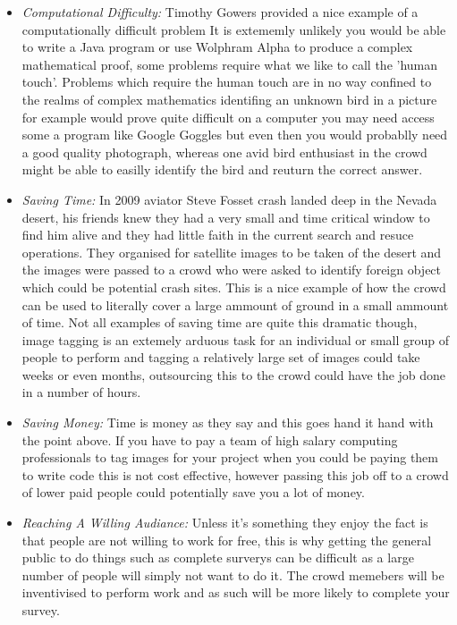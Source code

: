 \documentclass[11pt]{article}
\begin{document}
\begin{itemize}
\item
\emph{Computational Difficulty:} Timothy Gowers provided a nice example of a computationally difficult problem It is extememly unlikely you
would be able to write a Java program or use Wolphram Alpha to produce a complex mathematical proof, some problems require what we like to call
the 'human touch'. Problems which require the human touch are in no way confined to the realms of complex mathematics identifing an unknown
bird in a picture for example would prove quite difficult on a computer you may need access some a program like Google Goggles but even then you 
would probablly need a good quality photograph, whereas one avid bird enthusiast in the crowd might be able to easilly identify the bird and
reuturn the correct answer.
\item
\emph{Saving Time:} In 2009 aviator Steve Fosset crash landed deep in the Nevada desert, his friends knew they had a very small
and time critical window to find him alive and they had little faith in the current search and resuce operations. They organised for satellite 
images to be taken of the desert and the images were passed to a crowd who were asked to identify foreign object which could be potential crash 
sites. This is a nice example of how the crowd can be used to literally cover a large ammount of ground in a small ammount of time. Not all 
examples of saving time are quite this dramatic though, image tagging is an extemely arduous task for an individual or small group of people 
to perform and tagging a relatively large set of images could take weeks or even months, outsourcing this to the crowd could have the job 
done in a number of hours.
\item
\emph{Saving Money:} Time is money as they say and this goes hand it hand with the point above. If you have to pay a team of high salary computing
professionals to tag images for your project when you could be paying them to write code this is not cost effective, however passing this job off
to a crowd of lower paid people could potentially save you a lot of money. 
\item
\emph{Reaching A Willing Audiance:} Unless it's something they enjoy the fact is that people are not willing to work for free, this is why
getting the general public to do things such as complete surverys can be difficult as a large number of people will simply not want to do it. The
crowd memebers will be inventivised to perform work and as such will be more likely to complete your survey.
\end{itemize}
\end{document}
